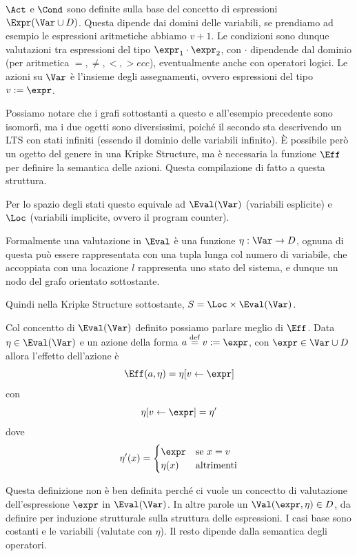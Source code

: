 \(\Act\) e \(\Cond\) sono definite sulla base del concetto di espressioni \(\Expr(\Var\cup D)\). Questa dipende dai domini delle variabili, se prendiamo ad esempio le espressioni aritmetiche abbiamo \(v+1\).
Le condizioni sono dunque valutazioni tra espressioni del tipo \(\expr_1 \cdot \expr_2\), con \(\cdot\) dipendende dal dominio (per aritmetica \(=, \neq, <, > ecc\)), eventualmente anche con operatori logici.
Le azioni su \(\Var\) è l'insieme degli assegnamenti, ovvero espressioni del tipo \(v := \expr\).


Possiamo notare che i grafi sottostanti a questo e all'esempio precedente sono isomorfi, ma i due ogetti sono diversissimi, poiché il secondo sta descrivendo un LTS con stati infiniti (essendo il dominio delle variabili infinito).
È possibile però  un ogetto del genere in una Kripke Structure, ma è necessaria la funzione \(\Eff\) per definire la semantica delle azioni.
Questa compilazione di fatto  a questa struttura.

Per lo spazio degli stati questo equivale ad \(\Eval(\Var)\) (variabili esplicite) e \(\Loc\) (variabili implicite, ovvero il program counter).

Formalmente una valutazione in \(\Eval\) è una funzione \(\eta: \Var \to D\), ognuna di questa può essere rappresentata con una tupla lunga col numero di variabile, che accoppiata con una locazione \(l\) rappresenta uno stato del sistema, e dunque un nodo del grafo orientato sottostante.

Quindi nella Kripke Structure sottostante, \(S = \Loc \times \Eval(\Var)\).

Col concentto di \(\Eval(\Var)\) definito possiamo parlare meglio di \(\Eff\). Data \(\eta \in \Eval(\Var)\) e un azione della forma \(a \overset{\text{def}}{=} v := \expr\), con \(\expr \in \Var \cup D\) allora l'effetto dell'azione è
\[\Eff(a,\eta)=\eta[v\leftarrow \expr]\]
con
\[\eta[v\leftarrow \expr] = \eta'\]
dove
\[\eta' (x)= \begin{cases}
    \expr   & \text{se } x = v  \\
    \eta(x) & \text{altrimenti}
  \end{cases}\]

Questa definizione non è ben definita perché ci vuole un concectto di valutazione dell'espressione \(\expr\) in \(\Eval(\Var)\). In altre parole un \(\Val(\expr, \eta) \in D\), da definire per induzione strutturale sulla struttura delle espressioni.
I casi base sono costanti e le variabili (valutate con \(\eta\)). Il resto dipende dalla semantica degli operatori.

